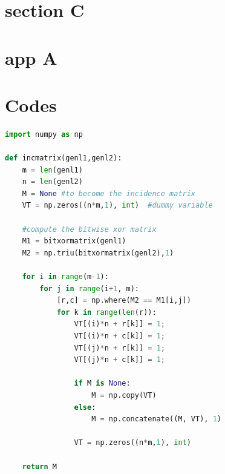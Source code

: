 \appendix
\section{section C}
\zhlipsum[13]

\section{app A}
\zhlipsum[14-15]

\section{Codes}
\begin{mdframed}
    \begin{lstlisting}[language=Python]
import numpy as np
    
def incmatrix(genl1,genl2):
    m = len(genl1)
    n = len(genl2)
    M = None #to become the incidence matrix
    VT = np.zeros((n*m,1), int)  #dummy variable
    
    #compute the bitwise xor matrix
    M1 = bitxormatrix(genl1)
    M2 = np.triu(bitxormatrix(genl2),1) 

    for i in range(m-1):
        for j in range(i+1, m):
            [r,c] = np.where(M2 == M1[i,j])
            for k in range(len(r)):
                VT[(i)*n + r[k]] = 1;
                VT[(i)*n + c[k]] = 1;
                VT[(j)*n + r[k]] = 1;
                VT[(j)*n + c[k]] = 1;
                
                if M is None:
                    M = np.copy(VT)
                else:
                    M = np.concatenate((M, VT), 1)
                
                VT = np.zeros((n*m,1), int)
    
    return M
\end{lstlisting}
\end{mdframed}


